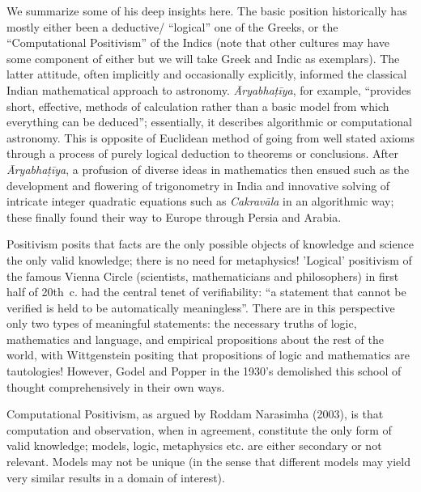 {We summarize some of his deep insights here. The basic position historically has mostly either been a deductive/ “logical” one of the Greeks, or the “Computational Positivism” of the Indics (note that other cultures may have some component of either but we will take Greek and Indic as exemplars). The latter attitude, often implicitly and occasionally explicitly, informed the classical Indian mathematical approach to astronomy. \textsl{Āryabhaṭīya}, for example, “provides short, effective, methods of calculation rather than a basic model from which everything can be deduced”; essentially, it describes algorithmic or computational astronomy. This is opposite of Euclidean method of going from well stated axioms through a process of purely logical deduction to theorems or conclusions. After \textsl{Āryabhaṭīya}, a profusion of diverse ideas in mathematics then ensued such as the development and flowering of trigonometry in India and innovative solving of intricate integer quadratic equations such as \textsl{Cakravāla} in an algorithmic way; these finally found their way to Europe through Persia and Arabia.

Positivism posits that facts are the only possible objects of knowledge and science the only valid knowledge; there is no need for metaphysics! 'Logical' positivism of the famous Vienna Circle (scientists, mathematicians and philosophers) in first half of 20th~c. had the central tenet of verifiability: “a statement that cannot be verified is held to be automatically meaningless”. There are in this perspective only two types of meaningful statements: the necessary truths of logic, mathematics and language, and empirical propositions about the rest of the world, with Wittgenstein positing that propositions of logic and mathematics are tautologies! However, Godel and Popper in the 1930’s demolished this school of thought comprehensively in their own ways. 

Computational Positivism, as argued by Roddam Narasimha (2003), is that computation and observation, when in agreement, constitute the only form of valid knowledge; models, logic, metaphysics etc. are either secondary or not relevant. Models may not be unique (in the sense that different models may yield very similar results in a domain of interest).

}
